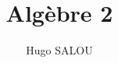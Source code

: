 \documentclass{../../notes}
\title{Algèbre 2}
\author{Hugo SALOU}
\begin{document}
  \maketitle

  
  \dominitoc
  \tableofcontents

  \pagebreak

  
\end{document}
